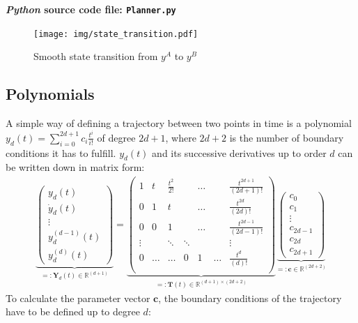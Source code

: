 \documentclass[a4paper,11pt,headings=standardclasses,parskip=half]{scrartcl}
\newcommand{\R}{\mathbb{R}} %
\newcommand{\py}{\emph{Python}\xspace}
\begin{document}
\textbf{\py source code file: \texttt{Planner.py}}
\begin{figure}[ht]
\centering
\texttt{[image: img/state\_transition.pdf]}
\caption{Smooth state transition from $y^A$ to $y^B$}
\end{figure}
\subsection{Polynomials} \label{sec:polynomials}
A simple way of defining a trajectory between two points in time is a polynomial $y_d(t)=\sum_{i=0}^{2d+1}c_i\frac{t^i}{i!}$ of degree $2d+1$, where $2d+2$ is the number of boundary conditions it has to fulfill. $y_d(t)$ and its successive derivatives up to order $d$ can be written down in matrix form:
\begin{align}
\label{eq:1}
\underbrace{\begin{pmatrix}
y_d(t) \\ \dot{y}_d(t) \\ \vdots \\ y_d^{(d-1)}(t) \\ y_d^{(d)}(t)
\end{pmatrix}}_{=:\mathbf{Y}_d(t) \in \R^{(d+1)}}
=\underbrace{\begin{pmatrix}
1 &t & \frac{t^2}{2!}&         &  \hdots         &  & \frac{t^{2d+1}}{(2d+1)!} \\
0 &1   & t             &         &  \hdots         &  & \frac{t^{2d}}{(2d)!} \\
0 &0   & 1               &         & \hdots          &  &  \frac{t^{2d-1}}{(2d-1)!} \\
\vdots &                 &  \ddots & \ddots &  &   &  \vdots \\
0      &\hdots           & \hdots       & 0 & 1& \hdots & \frac{t^{d}}{(d)!} \\
\end{pmatrix}}_{=:\mathbf{T}(t)\in \R^{(d+1)\times (2d+2)}}
\underbrace{
\begin{pmatrix}
c_0 \\ c_1 \\ \vdots \\ c_{2d-1}\\ c_{2d}\\ c_{2d+1} 
\end{pmatrix}}_{=:\mathbf{c}\in \R^{(2d+2)}}
\end{align}
To calculate the parameter vector $\mathbf{c}$, the boundary conditions of the trajectory have to be defined up to degree $d$:
\end{document}
